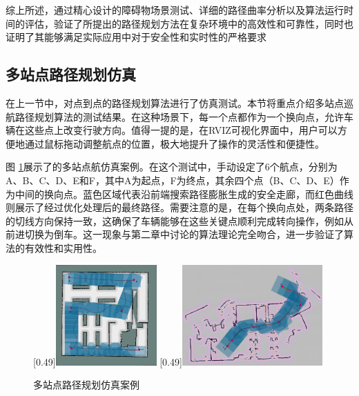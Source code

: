 \documentclass[master,academic]{ysuthesis} %
\begin{document}
		综上所述，通过精心设计的障碍物场景测试、详细的路径曲率分析以及算法运行时间的评估，验证了所提出的路径规划方法在复杂环境中的高效性和可靠性，同时也证明了其能够满足实际应用中对于安全性和实时性的严格要求

		\subsection{多站点路径规划仿真}
		在上一节中，对点到点的路径规划算法进行了仿真测试。本节将重点介绍多站点巡航路径规划算法的测试结果。在这种场景下，每一个点都作为一个换向点，允许车辆在这些点上改变行驶方向。值得一提的是，在RVIZ可视化界面中，用户可以方便地通过鼠标拖动调整航点的位置，极大地提升了操作的灵活性和便捷性。

		图 \ref{fig:多点路径规划仿真案例}展示了的多站点航仿真案例。在这个测试中，手动设定了6个航点，分别为A、B、C、D、E和F，其中A为起点，F为终点，其余四个点（B、C、D、E）作为中间的换向点。蓝色区域代表沿前端搜索路径膨胀生成的安全走廊，而红色曲线则展示了经过优化处理后的最终路径。需要注意的是，在每个换向点处，两条路径的切线方向保持一致，这确保了车辆能够在这些关键点顺利完成转向操作，例如从前进切换为倒车。这一现象与第二章中讨论的算法理论完全吻合，进一步验证了算法的有效性和实用性。
		
		\begin{figure}[H]
			\centering
			[0.49\textwidth]{\includegraphics[width=0.344\textwidth]{muti.png}}
			[0.49\textwidth]{\includegraphics[width=0.48\textwidth]{dataminco.png}}
			\caption{多站点路径规划仿真案例}
			\label{fig:多点路径规划仿真案例}
			\end{figure}
		
\end{document}
